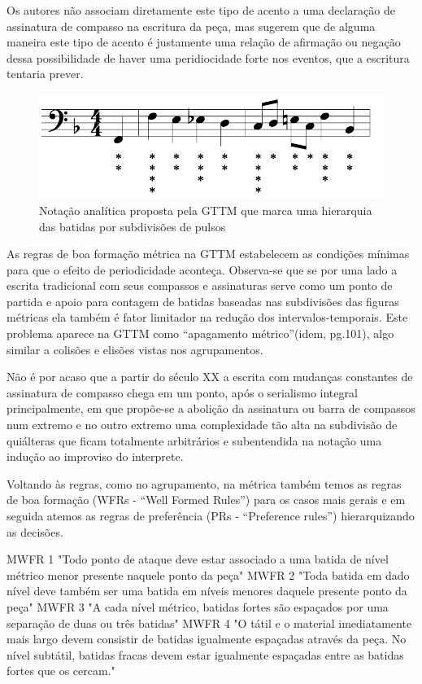 \documentclass[
	12pt,				%
	openright,			%
	twoside,			%
	a4paper,			%
	english,			%
	french,				%
	spanish,			%
	brazil				%
	]{abntex2}
\begin{document}
Os autores não associam diretamente este tipo de acento a uma declaração de assinatura de compasso na escritura da peça, mas sugerem que de alguma maneira este tipo de acento é justamente uma relação de afirmação ou negação dessa possibilidade de haver uma peridiocidade forte nos eventos, que a escritura tentaria prever. 


\begin{figure}[htb]
	\caption{\label{fig_grafico}Notação analítica proposta pela GTTM que marca uma hierarquia das batidas por subdivisões de pulsos}
	\begin{center}
	    \includegraphics[scale=0.45]{gttm/GTTM-m21-metes.png}
	\end{center}
\end{figure}


As regras de boa formação métrica na GTTM estabelecem as condições mínimas para que o efeito de periodicidade aconteça.  Observa-se que se por uma lado a escrita tradicional com seus compassos e assinaturas serve como um ponto de partida e apoio para contagem de batidas baseadas nas subdivisões das figuras métricas ela também é fator limitador na redução dos intervalos-temporais. Este problema aparece na GTTM como “apagamento métrico”(idem, pg.101), algo similar a colisões e elisões vistas nos agrupamentos. 

Não é por acaso que a partir do século XX a escrita com mudanças constantes de assinatura de compasso chega em um ponto, após o serialismo integral principalmente, em que propõe-se a abolição da assinatura ou barra de compassos num extremo e no outro extremo uma complexidade tão alta na subdivisão de quiálteras que ficam totalmente arbitrários e subentendida na notação uma indução ao improviso do interprete.

Voltando às regras, como no agrupamento, na métrica também temos as regras de boa formação (WFRs - “Well Formed Rules”) para os casos mais gerais e em seguida atemos as regras de preferência (PRs - “Preference rules”) hierarquizando as decisões.

\begin{citacao}
MWFR 1 "Todo ponto de ataque deve estar associado a uma batida de nível métrico menor presente naquele ponto da peça" 
MWFR 2 "Toda batida em dado nível deve também ser uma batida em níveis menores daquele presente ponto da peça" 
MWFR 3 "A cada nível métrico, batidas fortes são espaçados por uma separação de duas ou três batidas" 
MWFR 4 "O tátil e o material imediatamente mais largo devem consistir de batidas igualmente espaçadas através da peça. No nível subtátil, batidas fracas devem estar igualmente espaçadas entre as batidas fortes que os cercam." 
 \cite{lerdahl1983generative}
\end{citacao} 
\end{document}
